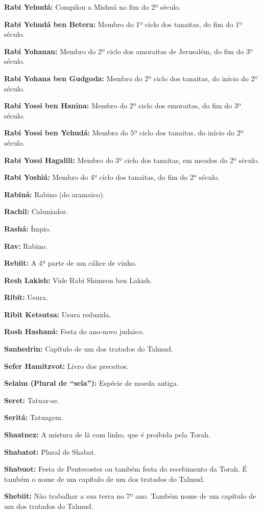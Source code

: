 \begin{hangparas}{.25in}{1}
{\textbf{Rabi Yehudá:} Compilou a Mishná no fim do 2º século.

\textbf{Rabi Yehudá ben Betera:} Membro do 1º ciclo dos tanaitas, do
fim do 1º século.

\textbf{Rabi Yohanan:} Membro do 2º ciclo dos amoraitas de Jerusalém,
do fim do 3º século.

\textbf{Rabi Yohana ben Gudgoda:} Membro do 2º ciclo dos tanaitas, do
início do 2º século.

\textbf{Rabi Yossi ben Hanina:} Membro do 2º ciclo dos emoraitas, do fim do 3º século.

\textbf{Rabi Yossi ben Yehudá:} Membro do 5º ciclo dos tanaitas, do início do
2º século.

\textbf{Rabi Yossi Hagalili:} Membro do 3º ciclo dos tanaitas, em meados do 2º século.

\textbf{Rabi Yoshiá:} Membro do 4º ciclo dos tanaitas, do fim do 2º século.

\textbf{Rabiná:} Rabino (do aramaico).

\textbf{Rachil:} Caluniador.

\textbf{Rashá:} Ímpio.

\textbf{Rav:} Rabino.

\textbf{Rebiit:} A 4ª parte de um cálice de vinho.

\textbf{Resh Lakish:} Vide Rabi Shimeon ben Lakish.

\textbf{Ribit:} Usura.

\textbf{Ribit Ketsutsa:} Usura reduzida.

\textbf{Rosh Hashaná:} Festa do ano-novo judaico.

\textbf{Sanhedrin:} Capítulo de um dos tratados do Talmud.

\textbf{Sefer Hamitzvot:} Livro dos preceitos.

\textbf{Selaim (Plural de ``sela''):} Espécie de moeda antiga.

\textbf{Seret:} Tatuar-se.

\textbf{Seritá:} Tatuagem.

\textbf{Shaatnez:} A mistura de lã com linho, que é proibida pela
Torah.

\textbf{Shabatot:} Plural de Shabat.

\textbf{Shabuot:} Festa de Pentecostes ou também festa do recebimento
da Torah. É também o nome de um capítulo de um dos tratados do Talmud.

\textbf{Shebiit:} Não trabalhar a sua terra no 7º ano. Também nome de
um capítulo de um dos tratados do Talmud.

}
\end{hangparas}
